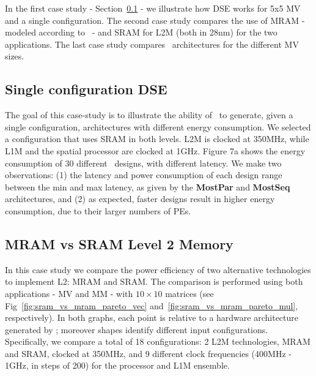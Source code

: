 In the first case study - Section~\ref{ssec:exp_single} - we illustrate how DSE works for 5x5 MV and a single configuration. The second case study compares the use of MRAM - modeled according to~\cite{8310393} - and SRAM for L2M (both in 28nm) for the two applications. The last case study compares \frameworkname~architectures for the different MV sizes.

\vspace{-1mm}
\subsection{Single configuration DSE}
\label{ssec:exp_single}
\vspace{-1mm}
The goal of this case-study is to illustrate the ability of \frameworkname~to generate, given a single configuration, architectures with different energy consumption. We selected a configuration that uses SRAM in both levels. L2M is clocked at 350MHz, while L1M and the spatial processor are clocked at 1GHz. Figure 7a shows the energy consumption of 30 different \frameworkname~designs, with different latency. We make two observations: (1) the latency and power consumption of each design range between the min and max latency, as given by the \textbf{MostPar} and \textbf{MostSeq} architectures, and (2) as expected, faster designs result in higher energy consumption, due to their larger numbers of PEs.


\vspace{-1mm}
\subsection{MRAM vs SRAM Level 2 Memory}
\label{ssec:case_study2}
\vspace{-1mm}

In this case study we compare the power efficiency of two alternative technologies to implement L2: MRAM and SRAM.
The comparison is performed using both applications - MV and MM - with $10\times10$ matrices (see Fig~\ref{fig:sram_vs_mram_pareto_vec} and~\ref{fig:sram_vs_mram_pareto_mul}, respectively). In both graphs, each point is relative to a hardware architecture generated by \frameworkname; moreover shapes identify different input configurations. Specifically, we compare a total of 18 configurations: 2 L2M technologies, MRAM and SRAM, clocked at 350MHz, and 9 different clock frequencies (400MHz - 1GHz, in steps of 200) for the processor and L1M ensemble.

